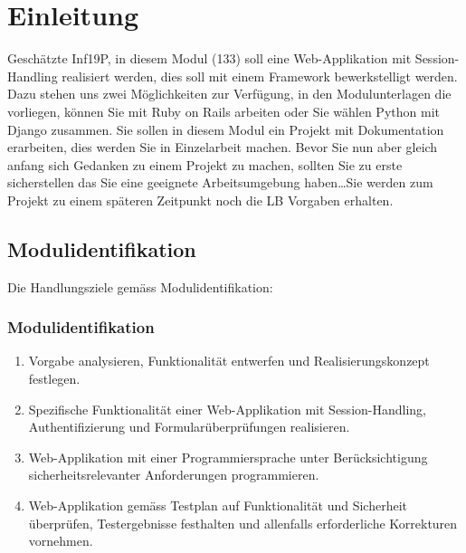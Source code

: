 \mode*


\section{Einleitung}
\label{sec:einleitung}

\begin{frame}[fragile]
    Geschätzte Inf19P, in diesem Modul (133) soll eine Web-Applikation mit Session-Handling realisiert werden, dies soll
    mit einem Framework bewerkstelligt werden.
    Dazu stehen uns zwei Möglichkeiten zur Verfügung, in den Modulunterlagen die vorliegen, können Sie mit Ruby on Rails arbeiten
    oder Sie wählen Python mit Django zusammen.
    Sie sollen in diesem Modul ein Projekt mit Dokumentation erarbeiten, dies werden Sie in Einzelarbeit machen.
    Bevor Sie nun aber gleich anfang sich Gedanken zu einem Projekt zu machen, sollten Sie zu erste sicherstellen das
    Sie eine geeignete Arbeitsumgebung haben\ldots\newline Sie werden zum Projekt zu einem späteren Zeitpunkt noch die LB Vorgaben erhalten.
\end{frame}

\subsection{Modulidentifikation}
\label{subsec:modulid}
Die Handlungsziele gemäss Modulidentifikation:
\begin{frame}[fragile]
    \frametitle<presentation>{Modulidentifikation}
    \begin{enumerate}
        \item Vorgabe analysieren, Funktionalität entwerfen und
        Realisierungskonzept festlegen.
        \item Spezifische Funktionalität einer Web-Applikation mit Session-Handling,
        Authentifizierung und Formularüberprüfungen realisieren.
        \item Web-Applikation mit einer Programmiersprache unter
        Berücksichtigung sicherheitsrelevanter Anforderungen
        programmieren.
        \item Web-Applikation gemäss Testplan auf Funktionalität und
        Sicherheit überprüfen, Testergebnisse festhalten und
        allenfalls erforderliche Korrekturen vornehmen.
    \end{enumerate}
\end{frame}

